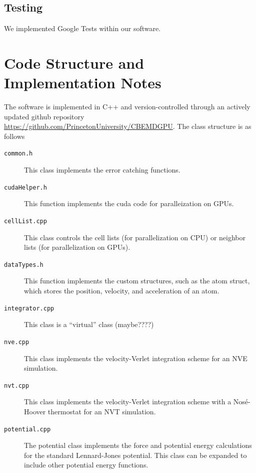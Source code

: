 \documentclass[12pt]{article}
\begin{document}
\subsection{Testing}

We implemented Google Tests within our software.


\section{Code Structure and Implementation Notes}

The software is implemented in C++ and version-controlled through an actively updated github repository \url{https://github.com/PrincetonUniversity/CBEMDGPU}.
%
The class structure is as follows
\begin{description}

\item[\texttt{common.h}] This class implements the error catching functions.

\item[\texttt{cudaHelper.h}] This function implements the cuda code for paralleization on GPUs.

\item[\texttt{cellList.cpp}] This class controls the cell lists (for parallelization on CPU) or neighbor lists (for parallelization on GPUs).

\item[\texttt{dataTypes.h}] This function implements the custom structures, such as the atom struct, which stores the position, velocity, and acceleration of an atom.
	
\item[\texttt{integrator.cpp}] This class is a ``virtual'' class (maybe????)

\item[\texttt{nve.cpp}] This class implements the velocity-Verlet integration scheme for an NVE simulation.

\item[\texttt{nvt.cpp}] This class implements the velocity-Verlet integration scheme with a Nos\'{e}-Hoover thermostat for an NVT simulation.

\item[\texttt{potential.cpp}] The potential class implements the force and potential energy calculations for the standard Lennard-Jones potential.
%
This class can be expanded to include other potential energy functions.


\end{description}
\end{document}

